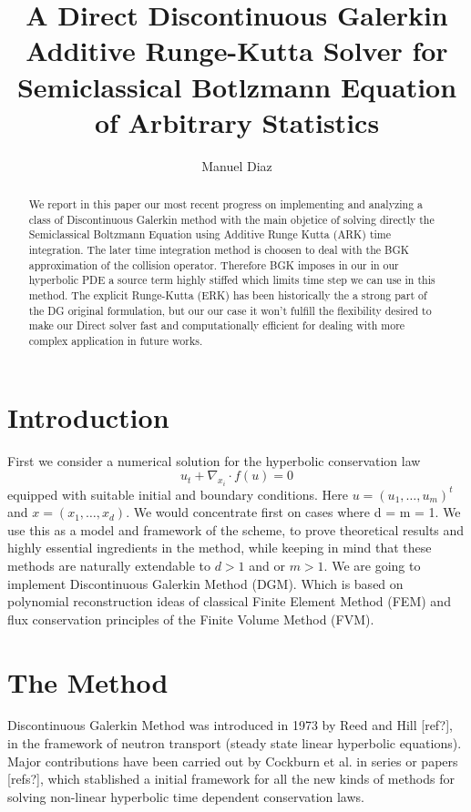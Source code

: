 \documentclass[a4paper,10pt]{article}
\title{A Direct Discontinuous Galerkin Additive Runge-Kutta Solver 
for Semiclassical Botlzmann Equation of Arbitrary Statistics}
\author{Manuel Diaz}
\begin{document}
\maketitle

\begin{abstract}
We report in this paper our most recent progress on implementing and analyzing a class of Discontinuous Galerkin method with the main objetice of solving directly the Semiclassical Boltzmann Equation using Additive Runge Kutta (ARK) time integration. The later time integration method is choosen to deal with the BGK approximation of the collision operator. Therefore BGK imposes in our in our hyperbolic PDE a source term highly stiffed which limits time step we can use in this method. The explicit Runge-Kutta (ERK) has been historically the a strong part of the DG original formulation, but our our case it won't fulfill the flexibility desired to make our Direct solver fast and computationally efficient for dealing with more complex application in future works.

\end{abstract}

\section{Introduction}
First we consider a numerical solution for the hyperbolic conservation law
\begin{equation}
 u_t + \nabla_{x_i} \cdot f(u) = 0
\end{equation}
equipped with suitable initial and boundary conditions. Here
$ u = (u_1, \dots , u_m)^t$ and $x = (x_1, \dots , x_d)$. 
We would concentrate first on cases where d = m = 1. We use this as a model and framework of the scheme, to prove theoretical results and highly essential ingredients in the method, while keeping in mind that these methods are naturally extendable to $d > 1$ and or $m > 1$.
We are going to implement Discontinuous Galerkin Method (DGM). Which is based on polynomial reconstruction ideas of classical Finite Element Method (FEM) and flux conservation principles of the Finite Volume Method (FVM).

\section{The Method}
Discontinuous Galerkin Method was introduced in 1973 by Reed and Hill [ref?], in the framework of neutron transport (steady state linear hyperbolic equations). Major contributions have been carried out by Cockburn et al. in series or papers [refs?], which stablished a initial framework for all the new kinds of methods for solving non-linear hyperbolic time dependent conservation laws.
\end{document}
